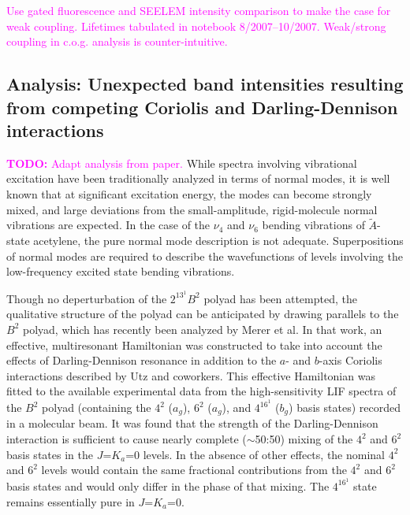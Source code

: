 \documentclass[12pt,draft]{mitthesis}
\newcommand{\TODO} [1]{\textcolor{magenta}{\textbf{TODO:} #1}}
\newcommand{\POINT}[1]{\textcolor{magenta}{#1}}
\begin{document}
\POINT{Use gated fluorescence and SEELEM intensity comparison to make
  the case for weak coupling. Lifetimes tabulated in notebook
  8/2007--10/2007.  Weak/strong coupling in c.o.g. analysis is
  counter-intuitive.}


\subsection{Analysis: Unexpected band intensities resulting from
  competing Coriolis and Darling-Dennison interactions}

\TODO{Adapt analysis from paper.}  While spectra involving vibrational
excitation have been traditionally analyzed in terms of normal modes,
it is well known that at significant excitation energy, the modes can
become strongly mixed, and large deviations from the small-amplitude,
rigid-molecule normal vibrations are expected.  In the case of the
$\nu_4$ and $\nu_6$ bending vibrations of $\tilde{A}$-state acetylene,
the pure normal mode description is not adequate. Superpositions of
normal modes are required to describe the wavefunctions of levels
involving the low-frequency excited state bending vibrations.

Though no deperturbation of the $2^13^1B^2$ polyad has been attempted,
the qualitative structure of the polyad can be anticipated by drawing
parallels to the $B^2$ polyad, which has recently been analyzed by
Merer et al.  In that work, an effective, multiresonant Hamiltonian
was constructed to take into account the effects of Darling-Dennison
resonance in addition to the $a$- and $b$-axis Coriolis interactions
described by Utz and coworkers.  This effective Hamiltonian was fitted
to the available experimental data from the high-sensitivity LIF
spectra of the $B^2$ polyad (containing the $4^2$ ($a_g$), $6^2$
($a_g$), and $4^16^1$ ($b_g$) basis states) recorded in a molecular
beam. It was found that the strength of the Darling-Dennison
interaction is sufficient to cause nearly complete ($\sim$50:50)
mixing of the $4^2$ and $6^2$ basis states in the $J$=$K_a$=0
levels. In the absence of other effects, the nominal $4^2$ and $6^2$
levels would contain the same fractional contributions from the $4^2$
and $6^2$ basis states and would only differ in the phase of that
mixing.  The $4^16^1$ state remains essentially pure in $J$=$K_a$=0.
\end{document}
